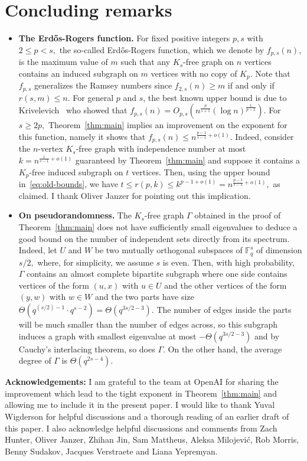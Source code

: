 \documentclass{article}
\theoremstyle{plain}
\theoremstyle{definition}
\newcommand{\bF}{\mathbb{F}}
\begin{document}
\section{Concluding remarks} \label{sec:concluding}
\begin{itemize}    
    \item \textbf{The Erd\H{o}s-Rogers function.} For fixed positive integers $p, s$ with $2 \le p < s,$ the so-called Erd\H{o}s-Rogers function, which we denote by $f_{p, s}(n)$, is the maximum value of $m$ such that any $K_s$-free graph on $n$ vertices contains an induced subgraph on $m$ vertices with no copy of $K_p$. Note that $f_{p, s}$ generalizes the Ramsey numbers since $f_{2, s}(n) \ge m$ if and only if $r(s, m) \le n$. For general $p$ and $s$, the best known upper bound is due to Krivelevich~\cite{krivelevich-erdos-rogers} who showed that $f_{p, s}(n) = O_{p,s}(n^{\frac{p}{s+1}} (\log n)^{\frac{1}{p-1}}).$ For $s \ge 2p,$ Theorem~\ref{thm:main} implies an improvement on the exponent for this function, namely it shows that $f_{p, s}(n) \le n^{\frac{p-1}{s-1} + o(1)}.$ Indeed, consider the $n$-vertex $K_s$-free graph with independence number at most $k = n^{\frac{1}{s-1} + o(1)}$ guaranteed by Theorem~\ref{thm:main} and suppose it contains a $K_p$-free induced subgraph on $t$ vertices. Then, using the upper bound in~\eqref{eq:old-bounds}, we have $t \le r(p, k) \le k^{p-1 + o(1)} = n^{\frac{p-1}{s-1} + o(1)},$ as claimed. I thank Oliver Janzer for pointing out this implication.
    
    \item \textbf{On pseudorandomness.} The $K_s$-free graph $\Gamma$ obtained in the proof of Theorem~\ref{thm:main} does not have sufficiently small eigenvalues to deduce a good bound on the number of independent sets directly from its spectrum. Indeed, let $U$ and $W$ be two mutually orthogonal subspaces of $\bF_q^s$ of dimension $s/2,$ where, for simplicity, we assume $s$ is even. Then, with high probability, $\Gamma$ contains an almost complete bipartite subgraph where one side contains vertices of the form $(u, x)$ with $u \in U$ and the other vertices of the form $(y, w)$ with $w \in W$ and the two parts have size $\Theta(q^{(s/2) - 1} \cdot q^{s-2}) = \Theta(q^{3s/2 - 3}).$ The number of edges inside the parts will be much smaller than the number of edges across, so this subgraph induces a graph with smallest eigenvalue at most $-\Theta(q^{3s/2 - 3})$ and by Cauchy's interlacing theorem, so does $\Gamma$. On the other hand, the average degree of $\Gamma$ is $\Theta(q^{2s-4})$.
\end{itemize}

\textbf{Acknowledgements:} I am grateful to the team at OpenAI for sharing the improvement which lead to the tight exponent in Theorem~\ref{thm:main} and allowing me to include it in the present paper. I would like to thank Yuval Wigderson for helpful discussions and a thorough reading of an earlier draft of this paper. I also acknowledge helpful discussions and comments from Zach Hunter, Oliver Janzer, Zhihan Jin, Sam Mattheus, Aleksa Milojevi\'{c}, Rob Morris, Benny Sudakov, Jacques Verstraete and Liana Yepremyan.




\appendix

\end{document}
